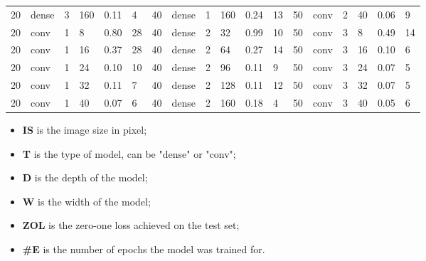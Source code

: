 \begin{table}
{\begin{tabular}{@{}llllll|llllll|llllll@{}}
20          & dense      & 3          & 160        & 0.11         & 4            & 40          & dense      & 1          & 160        & 0.24         & 13           & 50          & conv       & 2          & 40         & 0.06         & 9            \\
20          & conv       & 1          & 8          & 0.80         & 28           & 40          & dense      & 2          & 32         & 0.99         & 10           & 50          & conv       & 3          & 8          & 0.49         & 14           \\
20          & conv       & 1          & 16         & 0.37         & 28           & 40          & dense      & 2          & 64         & 0.27         & 14           & 50          & conv       & 3          & 16         & 0.10         & 6            \\
20          & conv       & 1          & 24         & 0.10         & 10           & 40          & dense      & 2          & 96         & 0.11         & 9            & 50          & conv       & 3          & 24         & 0.07         & 5            \\
20          & conv       & 1          & 32         & 0.11         & 7            & 40          & dense      & 2          & 128        & 0.11         & 12           & 50          & conv       & 3          & 32         & 0.07         & 5            \\
20          & conv       & 1          & 40         & 0.07         & 6            & 40          & dense      & 2          & 160        & 0.18         & 4            & 50          & conv       & 3          & 40         & 0.05         & 6            \\ \bottomrule
\end{tabular}}
\begin{itemize}
    \setlength\itemsep{0pt}
    \item[] \textbf{IS} is the image size in pixel;
    \item[] \textbf{T} is the type of model, can be "dense" or "conv";
    \item[] \textbf{D} is the depth of the model;
    \item[] \textbf{W} is the width of the model;
    \item[] \textbf{ZOL} is the zero-one loss achieved on the test set;
    \item[] \textbf{\#E} is the number of epochs the model was trained for.
\end{itemize}
\end{table}
